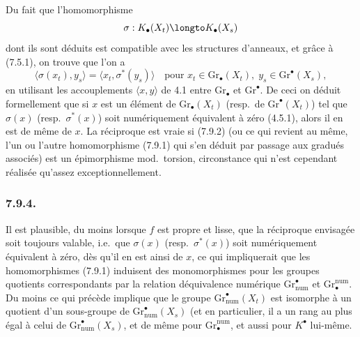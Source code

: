 Du fait que l'homomorphisme
\begin{equation}\label{eq:7.9.2}
\sigma : K_{\bullet}(X_{t}) \longto K_{\bullet}(X_{s})
\end{equation}
dont ils sont d\'eduits est compatible avec les structures d'anneaux, et gr\^ace \`a (7.5.1), on trouve que l'on a
\begin{equation}\label{eq:7.9.3}
\langle \sigma(x_{t}), y_{s} \rangle = \langle x_{t}, \sigma^{*}(y_{s}) \rangle \quad \text{pour } x_{t} \in \mathrm{Gr}_{\bullet}(X_{t}), \; y_{s} \in \mathrm{Gr}^{\bullet}(X_{s}),
\end{equation}
en utilisant les accouplements $\langle x, y \rangle$ de 4.1 entre $\mathrm{Gr}_{\bullet}$ et $\mathrm{Gr}^{\bullet}$. De ceci on d\'eduit formellement que si $x$ est un \'el\'ement de $\mathrm{Gr}_{\bullet}(X_{t})$ (resp.\ de $\mathrm{Gr}^{\bullet}(X_{t})$) tel que $\sigma(x)$ (resp.\ $\sigma^{*}(x)$) soit num\'eriquement \'equivalent \`a z\'ero (4.5.1), alors il en est de m\^eme de $x$. La r\'eciproque est vraie si (7.9.2) (ou ce qui revient au m\^eme, l'un ou l'autre homomorphisme (7.9.1) qui s'en d\'eduit par passage aux gradu\'es associ\'es) est un \'epimorphisme mod.\ torsion, circonstance qui n'est cependant r\'ealis\'ee qu'assez exceptionnellement.

\subsubsection*{7.9.4.}

Il est plausible, du moins lorsque $f$ est propre et lisse, que la r\'eciproque envisag\'ee soit toujours valable, i.e.\ que $\sigma(x)$ (resp.\ $\sigma^{*}(x)$) soit num\'eriquement \'equivalent \`a z\'ero, d\`es qu'il en est ainsi de $x$, ce qui impliquerait que les homomorphismes (7.9.1) induisent des monomorphismes pour les groupes quotients correspondants par la relation d\'equivalence num\'erique $\mathrm{Gr}^{\bullet}_{\mathrm{num}}$ et $\mathrm{Gr}_{\bullet}^{\mathrm{num}}$. Du moins ce qui pr\'ec\`ede implique que le groupe $\mathrm{Gr}^{\bullet}_{\mathrm{num}}(X_{t})$ est isomorphe \`a un quotient d'un sous-groupe de $\mathrm{Gr}^{\bullet}_{\mathrm{num}}(X_{s})$ (et en particulier, il a un rang au plus \'egal \`a celui de $\mathrm{Gr}^{\bullet}_{\mathrm{num}}(X_{s})$, et de m\^eme pour $\mathrm{Gr}_{\bullet}^{\mathrm{num}}$, et aussi pour $K^{\bullet}$ lui-m\^eme.

